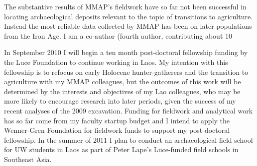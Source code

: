 \documentclass[11pt,article,oneside]{memoir}
\begin{document}
The substantive results of MMAP’s fieldwork have so far not been successful in locating archaeological deposits relevant to the topic of transitions to agriculture. Instead the most reliable data collected by MMAP has been on later populations from the Iron Age. I am a co-author (fourth author, contributing about 10%

In September 2010 I will begin a ten month post-doctoral fellowship funding by the Luce Foundation to continue working in Laos. My intention with this fellowship is to refocus on early Holocene hunter-gatherers and the transition to agriculture with my MMAP colleagues, but the outcomes of this work will be determined by the interests and objectives of my Lao colleagues, who may be more likely to encourage research into later periods, given the success of my recent analyses of the 2009 excavation. Funding for fieldwork and analytical work has so far come from my faculty startup budget and I intend to apply the Wenner-Gren Foundation for fieldwork funds to support my post-doctoral fellowship. In the summer of 2011 I plan to conduct an archaeological field school for UW students in Laos as part of Peter Lape’s Luce-funded field schools in Southeast Asia. 
\end{document}
